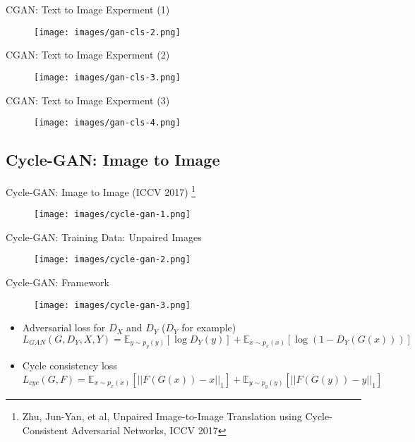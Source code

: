 \documentclass[handout]{beamer}
\begin{document}
\begin{frame}{CGAN: Text to Image Experment (1)}
	\begin{figure}
		\centering
		\texttt{[image: images/gan-cls-2.png]}
	\end{figure}
\end{frame}

\begin{frame}{CGAN: Text to Image Experment (2)}
	\begin{figure}
		\centering
		\texttt{[image: images/gan-cls-3.png]}
	\end{figure}
\end{frame}

\begin{frame}{CGAN: Text to Image Experment (3)}
	\begin{figure}
		\centering
		\texttt{[image: images/gan-cls-4.png]}
	\end{figure}
\end{frame}

\subsection{Cycle-GAN: Image to Image}

\begin{frame}{Cycle-GAN: Image to Image (ICCV 2017) \footnote{Zhu, Jun-Yan, et al, Unpaired Image-to-Image Translation using Cycle-Consistent Adversarial Networks, ICCV 2017}}
	\begin{figure}
		\centering
		\texttt{[image: images/cycle-gan-1.png]}
	\end{figure}
\end{frame}

\begin{frame}{Cycle-GAN: Training Data: Unpaired Images}
	\begin{figure}
		\centering
		\texttt{[image: images/cycle-gan-2.png]}
	\end{figure}
\end{frame}

\begin{frame}[<+->]{Cycle-GAN: Framework}
	\begin{actionenv}
		\begin{figure}
			\centering
			\texttt{[image: images/cycle-gan-3.png]}
		\end{figure}
	\end{actionenv}
	\begin{itemize}
		\item Adversarial loss for $D_X$ and $D_Y$ ($D_Y$ for example)
			$$L_{GAN}(G, D_Y, X, Y) = \mathbb{E}_{y \sim p_y(y)}[\log D_Y(y)] + \mathbb{E}_{x \sim p_x(x)}[\log (1 - D_Y(G(x)))]$$
		\item Cycle consistency loss
			$$L_{cyc}(G, F) = \mathbb{E}_{x \sim p_x(x)}[||F(G(x)) - x||_1] + \mathbb{E}_{y \sim p_y(y)}[||F(G(y)) - y||_1]$$
	\end{itemize}
\end{frame}
\end{document}
